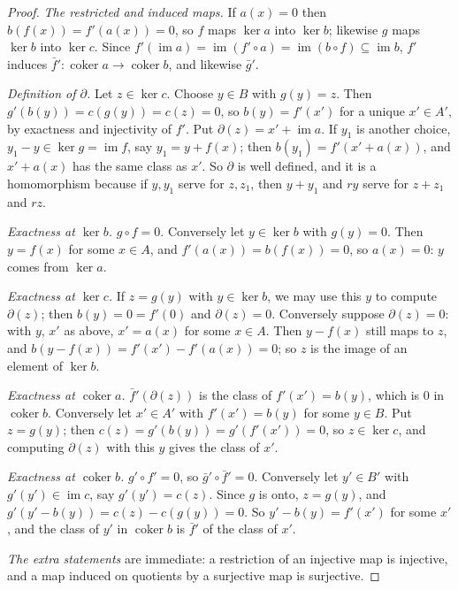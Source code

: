 \begin{proof}
\emph{The restricted and induced maps.} If $a(x)=0$ then $b(f(x))=f'(a(x))=0$, so $f$ maps $\ker a$ into $\ker b$; likewise $g$ maps $\ker b$ into $\ker c$. Since $f'(\operatorname{im}a)=\operatorname{im}(f'\circ a)=\operatorname{im}(b\circ f)\subseteq\operatorname{im}b$, $f'$
induces $\bar f'\colon\operatorname{coker}a\to\operatorname{coker}b$, and likewise $\bar g'$.

\emph{Definition of $\partial$.} Let $z\in\ker c$. Choose $y\in B$ with $g(y)=z$. Then $g'(b(y))=c(g(y))=c(z)=0$, so $b(y)=f'(x')$ for a unique $x'\in A'$, by exactness and injectivity of $f'$. Put $\partial(z)=x'+\operatorname{im}a$. If $y_1$ is another
choice, $y_1-y\in\ker g=\operatorname{im}f$, say $y_1=y+f(x)$; then $b(y_1)=f'(x'+a(x))$, and $x'+a(x)$ has the same class as $x'$. So $\partial$ is well defined, and it is a homomorphism because if $y,y_1$ serve for $z,z_1$, then $y+y_1$
and $ry$ serve for $z+z_1$ and $rz$.

\emph{Exactness at $\ker b$.} $g\circ f=0$. Conversely let $y\in\ker b$ with $g(y)=0$. Then $y=f(x)$ for some $x\in A$, and $f'(a(x))=b(f(x))=0$, so $a(x)=0$: $y$ comes from $\ker a$.

\emph{Exactness at $\ker c$.} If $z=g(y)$ with $y\in\ker b$, we may use this $y$ to compute $\partial(z)$; then $b(y)=0=f'(0)$ and $\partial(z)=0$. Conversely suppose $\partial(z)=0$: with $y$, $x'$ as above, $x'=a(x)$ for some $x\in A$. Then
$y-f(x)$ still maps to $z$, and $b(y-f(x))=f'(x')-f'(a(x))=0$; so $z$ is the image of an element of $\ker b$.

\emph{Exactness at $\operatorname{coker}a$.} $\bar f'(\partial(z))$ is the class of $f'(x')=b(y)$, which is $0$ in $\operatorname{coker}b$. Conversely let $x'\in A'$ with $f'(x')=b(y)$ for some $y\in B$. Put $z=g(y)$; then $c(z)=g'(b(y))=g'(f'(x'))=0$,
so $z\in\ker c$, and computing $\partial(z)$ with this $y$ gives the class of $x'$.

\emph{Exactness at $\operatorname{coker}b$.} $g'\circ f'=0$, so $\bar g'\circ\bar f'=0$. Conversely let $y'\in B'$ with $g'(y')\in\operatorname{im}c$, say $g'(y')=c(z)$. Since $g$ is onto, $z=g(y)$, and $g'(y'-b(y))=c(z)-c(g(y))=0$. So $y'-b(y)=f'(x')$ for some
$x'$, and the class of $y'$ in $\operatorname{coker}b$ is $\bar f'$ of the class of $x'$.

\emph{The extra statements} are immediate: a restriction of an injective map is injective, and a map induced on quotients by a surjective map is surjective.
\end{proof}

